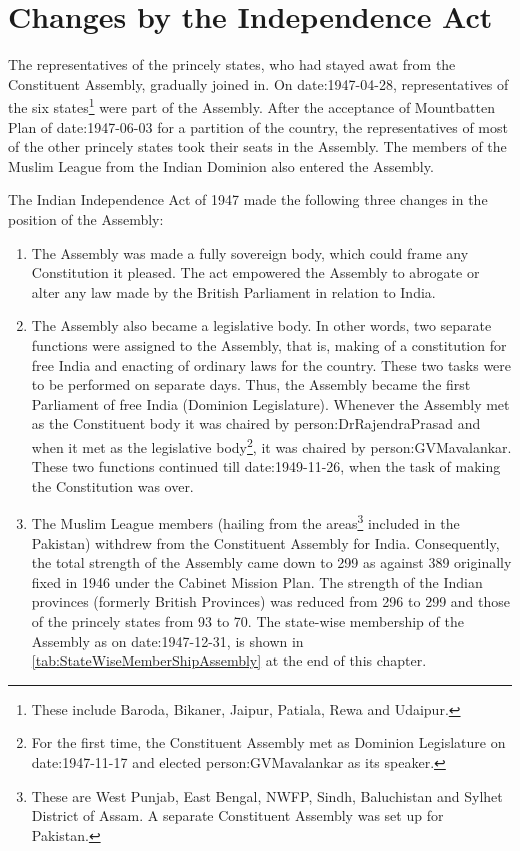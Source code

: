 \section{Changes by the Independence Act}

The representatives of the princely states, who had stayed awat from the Constituent Assembly, gradually joined in. On \gls{date:1947-04-28}, representatives of the six states\footnote{These include Baroda, Bikaner, Jaipur, Patiala, Rewa and Udaipur.} were part of the Assembly. After the acceptance of Mountbatten Plan of \gls{date:1947-06-03} for a partition of the country, the representatives of most of the other princely states took their seats in the Assembly. The members of the Muslim League from the Indian Dominion also entered the Assembly.

The Indian Independence Act of 1947 made the following three changes in the position of the Assembly:

\begin{enumerate}
  \item The Assembly was made a fully sovereign body, which could frame any Constitution it pleased. The act empowered the Assembly to abrogate or alter any law made by the British Parliament in relation to India.
  \item The Assembly also became a legislative body. In other words, two separate functions were assigned to the Assembly, that is, making of a constitution for free India and enacting of ordinary laws for the country. These two tasks were to be performed on separate days. Thus, the Assembly became the first Parliament of free India (Dominion Legislature). Whenever the Assembly met as the Constituent body it was chaired by \gls{person:DrRajendraPrasad} and when it met as the legislative body\footnote{For the first time, the Constituent Assembly met as Dominion Legislature on \gls{date:1947-11-17} and elected \gls{person:GVMavalankar} as its speaker.}, it was chaired by \gls{person:GVMavalankar}. These two functions continued till \gls{date:1949-11-26}, when the task of making the Constitution was over.
  \item The Muslim League members (hailing from the areas\footnote{These are West Punjab, East Bengal, NWFP, Sindh, Baluchistan and Sylhet District of Assam. A separate Constituent Assembly was set up for Pakistan.} included in the Pakistan) withdrew from the Constituent Assembly for India. Consequently, the total strength of the Assembly came down to 299 as against 389 originally fixed in 1946 under the Cabinet Mission Plan. The strength of the Indian provinces (formerly British Provinces) was reduced from 296 to 299 and those of the princely states from 93 to 70. The state-wise membership of the Assembly as on \gls{date:1947-12-31}, is shown in \ref{tab:StateWiseMemberShipAssembly} at the end of this chapter.
\end{enumerate}

